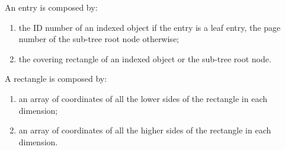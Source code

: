 An entry is composed by:
\begin{enumerate}
	\item
	the ID number of an indexed object if the entry is a leaf entry,
	the page number of the sub-tree root node otherwise;

	\item
	the covering rectangle of an indexed object or the sub-tree root node.\\
\end{enumerate}

A rectangle is composed by:
\begin{enumerate}
	\item
	an array of coordinates of all the lower sides of the rectangle
	in each dimension;
	\item
	an array of coordinates of all the higher sides of the rectangle
	in each dimension.
\end{enumerate}

